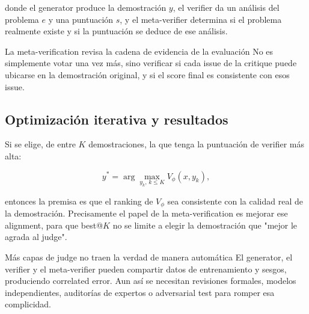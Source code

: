 donde el generator produce la demostración $y$, el verifier da un análisis del problema $e$ y una puntuación $s$, y el meta-verifier determina si el problema realmente existe y si la puntuación se deduce de ese análisis.


\begin{importantbox}{La meta-verification revisa la cadena de evidencia de la evaluación}
No es simplemente votar una vez más, sino verificar si cada issue de la critique puede ubicarse en la demostración original, y si el score final es consistente con esos issue.
\end{importantbox}

\subsection{Optimización iterativa y resultados}




Si se elige, de entre $K$ demostraciones, la que tenga la puntuación de verifier más alta:

$$
y^*=\arg\max_{y_k,\,k\le K}V_\phi(x,y_k),
$$

entonces la premisa es que el ranking de $V_\phi$ sea consistente con la calidad real de la demostración. Precisamente el papel de la meta-verification es mejorar ese alignment, para que best@$K$ no se limite a elegir la demostración que "mejor le agrada al judge".

\begin{warningbox}{Más capas de judge no traen la verdad de manera automática}
El generator, el verifier y el meta-verifier pueden compartir datos de entrenamiento y sesgos, produciendo correlated error. Aun así se necesitan revisiones formales, modelos independientes, auditorías de expertos o adversarial test para romper esa complicidad.
\end{warningbox}

